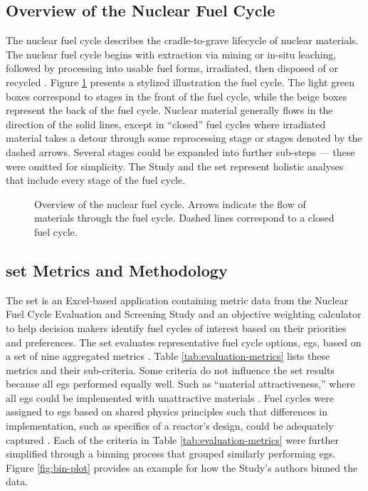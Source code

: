 \subsection{Overview of the Nuclear Fuel Cycle}

The nuclear fuel cycle describes the cradle-to-grave lifecycle of nuclear
materials. The nuclear fuel cycle begins with extraction via mining or in-situ
leaching, followed by processing into usable fuel forms, irradiated, then
disposed of or recycled \cite{tsoulfanidis_review_2013}. Figure
\ref{fig:nuclear-fuel-cycle} presents a stylized illustration the fuel cycle.
The light green boxes correspond to stages in the front of the fuel cycle, while
the beige boxes represent the back of the fuel cycle. Nuclear material generally
flows in the direction of the solid lines, except in ``closed'' fuel cycles
where irradiated material takes a detour through some reprocessing stage or
stages denoted by the dashed arrows. Several stages could be expanded into
further sub-steps --- these were omitted for simplicity. The Study and the
\ac{set} represent holistic analyses that include every stage of the fuel cycle.

\begin{figure}[htbp!]
  \centering
  \resizebox{\columnwidth}{!}{}
  \caption{Overview of the nuclear fuel cycle. Arrows indicate the flow of
  materials through the fuel cycle. Dashed lines correspond to a closed fuel
  cycle.}
  \label{fig:nuclear-fuel-cycle}
\end{figure}

\subsection{\ac{set} Metrics and Methodology}

The \ac{set} is an Excel-based application containing metric data from the
Nuclear Fuel Cycle Evaluation and Screening Study \cite{wigeland_nuclear_2014}
and an objective weighting calculator to help decision makers identify fuel
cycles of interest based on their priorities and preferences. The \ac{set}
evaluates representative fuel cycle options, \acp{eg}, based on a set of nine
aggregated metrics \cite{wigeland_nuclear_2014}. Table
\ref{tab:evaluation-metrics} lists these metrics and their sub-criteria. Some
criteria do not influence the \ac{set} results because all \acp{eg} performed
equally well. Such as ``material attractiveness,'' where all \acp{eg} could be
implemented with unattractive materials \cite{wigeland_nuclear_2014-1}. Fuel
cycles were assigned to \acp{eg} based on shared physics principles such that
differences in implementation, such as specifics of a reactor's design, could be
adequately captured \cite{wigeland_nuclear_2014}.  Each of the criteria in Table
\ref{tab:evaluation-metrics} were further simplified through a binning process
that grouped similarly performing \acp{eg}. Figure \ref{fig:bin-plot} provides
an example for how the Study's authors binned the data.

